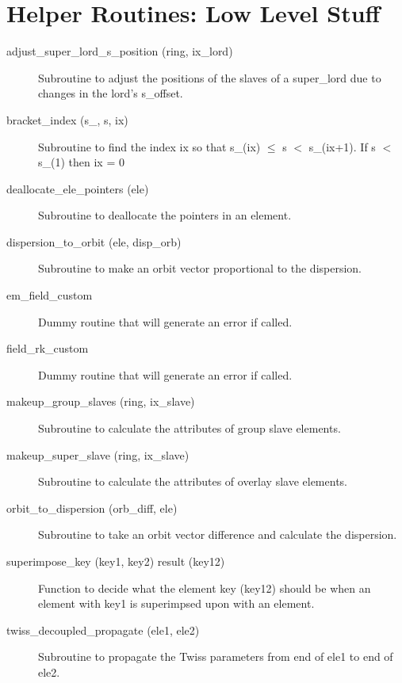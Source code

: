 \section{Helper Routines: Low Level Stuff}
\label{r:low_help} 

\begin{description}

\item[adjust\_super\_lord\_s\_position (ring, ix\_lord)] \Newline
Subroutine to adjust the positions of the slaves of a 
super\_lord due to changes in the lord's s\_offset. 

\item[bracket\_index (s\_, s, ix)] \Newline
Subroutine to find the index ix so that s\_(ix) $\le$ s $<$ s\_(ix+1). 
If s $<$ s\_(1) then ix = 0 

\item[deallocate\_ele\_pointers (ele)] \Newline
Subroutine to deallocate the pointers in an element. 

\item[dispersion\_to\_orbit (ele, disp\_orb)] \Newline
Subroutine to make an orbit vector proportional to the dispersion. 

\item[em\_field\_custom] \Newline
Dummy routine that will generate an error if called. 

\item[field\_rk\_custom] \Newline
Dummy routine that will generate an error if called. 

\item[makeup\_group\_slaves (ring, ix\_slave)] \Newline
Subroutine to calculate the attributes of group slave elements.

\item[makeup\_super\_slave (ring, ix\_slave)] \Newline
Subroutine to calculate the attributes of overlay slave elements. 

\item[orbit\_to\_dispersion (orb\_diff, ele)] \Newline
Subroutine to take an orbit vector difference and calculate the dispersion. 

\item[superimpose\_key (key1, key2) result (key12)] \Newline 
Function to decide what the element key (key12) should be when
an element with key1 is superimpsed upon with an element.

\item[twiss\_decoupled\_propagate (ele1, ele2)] \Newline
Subroutine to propagate the Twiss parameters from end of ele1 to end of ele2. 

\end{description}

